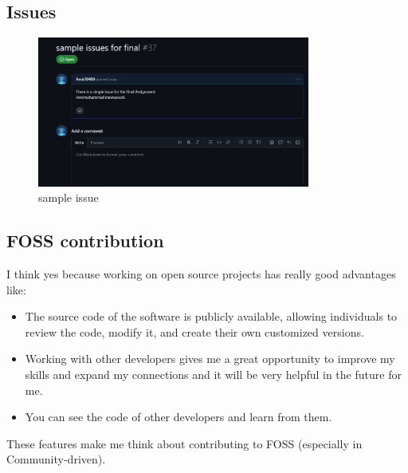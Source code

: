 \documentclass{article}
\begin{document}
    \subsection{Issues}
    \begin{figure}[h]
    \centering
    \includegraphics[width=0.8\textwidth]{sample issue.png}
    \caption{sample issue}
    \end{figure}
    \subsection{FOSS contribution}
    I think yes because working on open source projects has really good advantages like: 
    \begin{itemize}
        \item The source code of the software is publicly available, allowing individuals to review the code, modify it, and create their own customized versions.
        \item Working with other developers gives me a great opportunity to improve my skills and expand my connections and it will be very helpful in the future for me.
        \item You can see the code of other developers and learn from them.
        \end{itemize}
    These features make me think about contributing to FOSS (especially in Community-driven).
        
\end{document}
